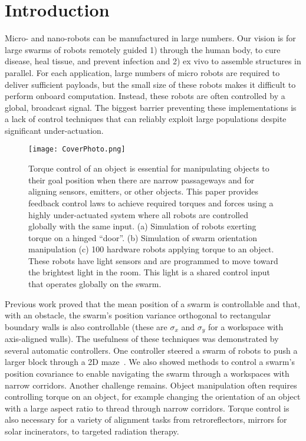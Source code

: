 \section{Introduction}\label{sec:Intro}
Micro- and nano-robots can be manufactured in large numbers.
Our vision is for large swarms of robots remotely guided 1) through the human body, to cure disease, heal tissue, and prevent infection and 2) ex vivo to assemble structures in parallel. 
 For each application, large numbers of micro robots are required  to deliver sufficient payloads, but the small size of these robots makes it difficult to perform onboard computation.  Instead, these robots are often controlled by a global, broadcast signal. 
 The biggest barrier preventing these implementations is a lack of control techniques that can reliably exploit large populations despite significant under-actuation.  
 

\begin{figure}
\begin{center}
	\texttt{[image: CoverPhoto.png]}
\end{center}
\vspace{-1em}
\caption{\label{fig:FirstImage}
Torque control of an object is essential for manipulating objects to their goal position  when there are narrow passageways and for aligning sensors, emitters, or other objects. 
This paper provides feedback control laws to achieve required torques and forces using a highly under-actuated system where all 
robots are controlled globally with the same input. 
(a) Simulation of robots exerting torque on a hinged ``door''.
(b) Simulation of swarm orientation manipulation
(c) 100 hardware robots applying torque to an object. These robots have light sensors and are programmed to move toward the brightest light in the room.  This light is a shared control input that operates globally on the swarm.
}
\vspace{-1em}
\end{figure}


Previous work proved that the mean position of a swarm is controllable and that, with an obstacle, the swarm's position variance orthogonal to rectangular boundary walls  is also controllable
(these are $\sigma_x$ and $\sigma_y$ for a workspace with axis-aligned walls). 
The usefulness of these techniques was demonstrated by several automatic controllers. One controller steered a swarm of robots to push a larger block through a 2D maze~\cite{ShahrokhiIROS2015}. 
We also showed methods to control a swarm's position covariance to enable navigating the swarm through a workspaces with narrow corridors.  
Another challenge remains. 
Object manipulation often requires controlling torque on an object, for example changing the orientation of an object with a large aspect ratio to thread through narrow corridors.
Torque control  is also necessary for a variety of alignment tasks from retroreflectors, mirrors for solar incinerators, to targeted radiation therapy.

